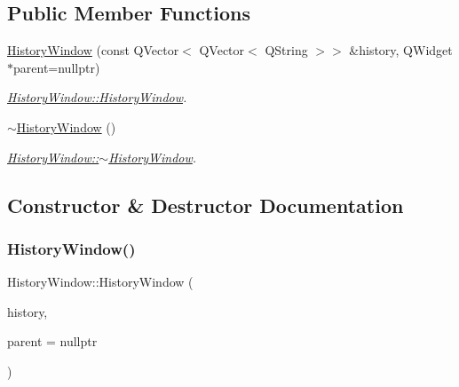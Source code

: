 \subsection*{Public Member Functions}
\begin{DoxyCompactItemize}
\item 
\hyperlink{class_history_window_ad545b50ee9a83c213221b3d937252d31}{History\+Window} (const Q\+Vector$<$ Q\+Vector$<$ Q\+String $>$$>$ \&history, Q\+Widget $\ast$parent=nullptr)
\begin{DoxyCompactList}\small\item\em \hyperlink{class_history_window_ad545b50ee9a83c213221b3d937252d31}{History\+Window\+::\+History\+Window}. \end{DoxyCompactList}\item 
\mbox{\label{class_history_window_afc23bcc3cd1a50efa9d26bfafedc44b6}} 
\hyperlink{class_history_window_afc23bcc3cd1a50efa9d26bfafedc44b6}{$\sim$\+History\+Window} ()
\begin{DoxyCompactList}\small\item\em \hyperlink{class_history_window_afc23bcc3cd1a50efa9d26bfafedc44b6}{History\+Window\+::$\sim$\+History\+Window}. \end{DoxyCompactList}\end{DoxyCompactItemize}


\subsection{Constructor \& Destructor Documentation}
\mbox{\label{class_history_window_ad545b50ee9a83c213221b3d937252d31}} 
\subsubsection{\texorpdfstring{History\+Window()}{HistoryWindow()}}
{\footnotesize\ttfamily History\+Window\+::\+History\+Window (\begin{DoxyParamCaption}\item[{const Q\+Vector$<$ Q\+Vector$<$ Q\+String $>$$>$ \&}]{history,  }\item[{Q\+Widget $\ast$}]{parent = {\ttfamily nullptr} }\end{DoxyParamCaption})}



